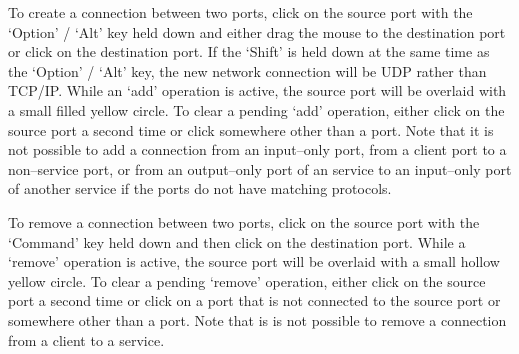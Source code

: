 To create a connection between two ports, click on the source port with the `Option' /
`Alt' key held down and either drag the mouse to the destination port or click on the
destination port.
If the `Shift' is held down at the same time as the `Option' / `Alt' key, the new
network connection will be UDP rather than TCP/IP.
While an `add' operation is active, the source port will be overlaid with a small filled
yellow circle.
To clear a pending `add' operation, either click on the source port a second time or click
somewhere other than a port.
Note that it is not possible to add a connection from an input--only port, from a client
port to a non--service port, or from an output--only port of an  service to
an input--only port of another  service if the ports do not have matching
protocols.


\clearpage
{}

To remove a connection between two ports, click on the source port with the `Command' key
held down and then click on the destination port.
While a `remove' operation is active, the source port will be overlaid with a small
hollow yellow circle.
To clear a pending `remove' operation, either click on the source port a second time or
click on a port that is not connected to the source port or somewhere other than a port.
Note that is is not possible to remove a connection from a client to a service.

